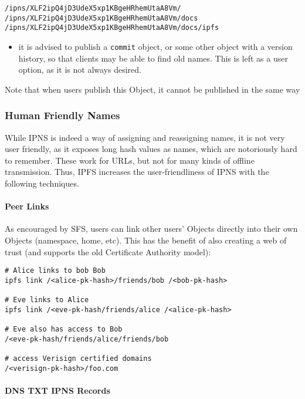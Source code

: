 \documentclass{sig-alternate}
\begin{document}
\begin{verbatim}
/ipns/XLF2ipQ4jD3UdeX5xp1KBgeHRhemUtaA8Vm/
/ipns/XLF2ipQ4jD3UdeX5xp1KBgeHRhemUtaA8Vm/docs
/ipns/XLF2ipQ4jD3UdeX5xp1KBgeHRhemUtaA8Vm/docs/ipfs
\end{verbatim}

\begin{itemize}
  \item it is advised to publish a \texttt{commit} object, or some other object with a version history, so that clients may be able to find old names. This is left as a user option, as it is not always desired.

\end{itemize}

Note that when users publish this Object, it cannot be published in the same way

\subsubsection{Human Friendly Names}

While IPNS is indeed a way of assigning and reassigning names, it is not very user friendly, as it exposes long hash values as names, which are notoriously hard to remember. These work for URLs, but not for many kinds of offline transmission. Thus, IPFS increases the user-friendliness of IPNS with the following techniques.

\paragraph{Peer Links}

As encouraged by SFS, users can link other users' Objects directly into their own Objects (namespace, home, etc). This has the benefit of also creating a web of trust (and supports the old Certificate Authority model):

\begin{verbatim}
# Alice links to bob Bob
ipfs link /<alice-pk-hash>/friends/bob /<bob-pk-hash>

# Eve links to Alice
ipfs link /<eve-pk-hash/friends/alice /<alice-pk-hash>

# Eve also has access to Bob
/<eve-pk-hash/friends/alice/friends/bob

# access Verisign certified domains
/<verisign-pk-hash>/foo.com
\end{verbatim}


\paragraph{DNS TXT IPNS Records}
\end{document}
